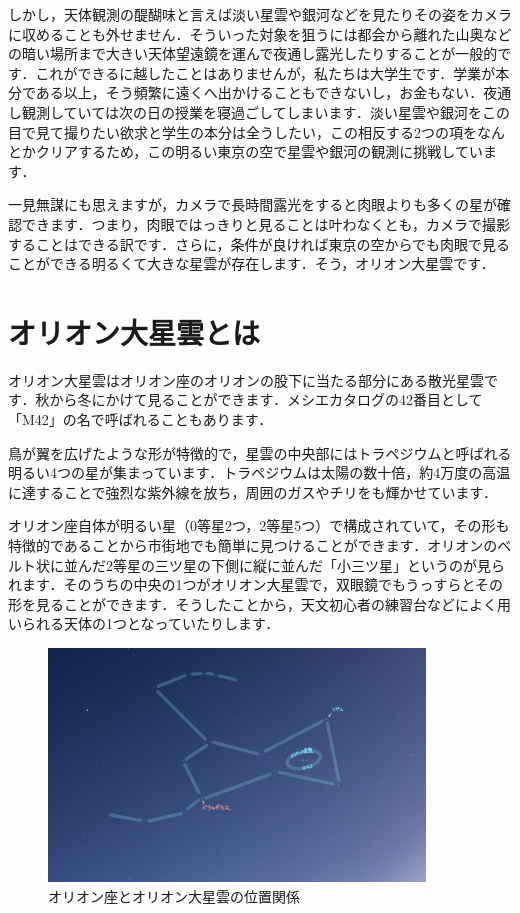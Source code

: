 \documentclass[../../super_nova_2023]{subfiles}
\begin{document}
しかし，天体観測の醍醐味と言えば淡い星雲や銀河などを見たりその姿をカメラに収めることも外せません．そういった対象を狙うには都会から離れた山奥などの暗い場所まで大きい天体望遠鏡を運んで夜通し露光したりすることが一般的です．これができるに越したことはありませんが，私たちは大学生です．学業が本分である以上，そう頻繁に遠くへ出かけることもできないし，お金もない．夜通し観測していては次の日の授業を寝過ごしてしまいます．淡い星雲や銀河をこの目で見て撮りたい欲求と学生の本分は全うしたい，この相反する2つの項をなんとかクリアするため，この明るい東京の空で星雲や銀河の観測に挑戦しています．

一見無謀にも思えますが，カメラで長時間露光をすると肉眼よりも多くの星が確認できます．つまり，肉眼ではっきりと見ることは叶わなくとも，カメラで撮影することはできる訳です．さらに，条件が良ければ東京の空からでも肉眼で見ることができる明るくて大きな星雲が存在します．そう，オリオン大星雲です．
\section{オリオン大星雲とは}
オリオン大星雲はオリオン座のオリオンの股下に当たる部分にある散光星雲です．秋から冬にかけて見ることができます．メシエカタログの42番目として「M42」の名で呼ばれることもあります．

鳥が翼を広げたような形が特徴的で，星雲の中央部にはトラペジウムと呼ばれる明るい4つの星が集まっています．トラペジウムは太陽の数十倍，約4万度の高温に達することで強烈な紫外線を放ち，周囲のガスやチリをも輝かせています．

オリオン座自体が明るい星（0等星2つ，2等星5つ）で構成されていて，その形も特徴的であることから市街地でも簡単に見つけることができます．オリオンのベルト状に並んだ2等星の三ツ星の下側に縦に並んだ「小三ツ星」というのが見られます．そのうちの中央の1つがオリオン大星雲で，双眼鏡でもうっすらとその形を見ることができます．そうしたことから，天文初心者の練習台などによく用いられる天体の1つとなっていたりします．
\begin{figure}
	\centering
	\includegraphics[width=10cm]{figures/Yosuke/Orion_line-2.jpg}
	\caption{オリオン座とオリオン大星雲の位置関係}
	\label{fig:Orion}
\end{figure}
\end{document}
